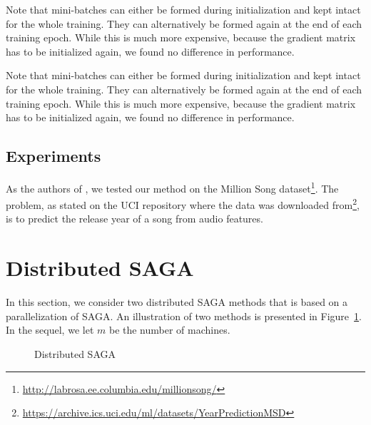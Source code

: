 \documentclass[a4paper,11pt]{article}
\begin{document}
Note that mini-batches can either be formed during initialization and kept
intact for the whole training. They can alternatively be formed again at the end
of each training epoch. While this is much more expensive, because the gradient
matrix has to be initialized again, we found no difference in performance.

Note that mini-batches can either be formed during initialization and kept
intact for the whole training. They can alternatively be formed again at the end
of each training epoch. While this is much more expensive, because the gradient
matrix has to be initialized again, we found no difference in performance.

\subsection{Experiments}

As the authors of \cite{defazio_saga_2014}, we tested our method on the Million
Song dataset\footnote{\url{http://labrosa.ee.columbia.edu/millionsong/}}. The
problem, as stated on the UCI repository where the data was downloaded
from\footnote{\url{https://archive.ics.uci.edu/ml/datasets/YearPredictionMSD}},
is to predict the release year of a song from audio features.

\section{Distributed SAGA}

In this section, we consider two distributed SAGA methods that is based on a parallelization of SAGA. An illustration of two methods is presented in Figure~\ref{2figs-show}. In the sequel, we let $m$ be the number of machines.

\begin{figure} [bt]
	\centering
	 \hspace{0pt}
	\caption{Distributed SAGA}
	\label{2figs-show}
\end{figure}
\end{document}
